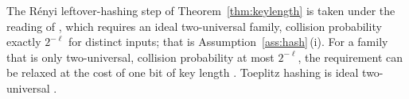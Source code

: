 
\begin{remark}\label{rem:hash-penalty}
The R\'enyi leftover-hashing step of Theorem~\ref{thm:keylength} is taken
under the reading of \cite[Lemma~6.5]{tupkary2026decoy}, which requires an
ideal two-universal family, collision probability exactly $2^{-\ell}$ for
distinct inputs; that is Assumption~\ref{ass:hash}\,(i).
For a family that is only two-universal, collision probability at most
$2^{-\ell}$, the requirement can be relaxed at the cost of one bit of key
length \cite[Rem.~6.1]{tupkary2026decoy}. Toeplitz hashing is ideal
two-universal \cite[Rem.~6.1]{tupkary2026decoy}.
\end{remark}
